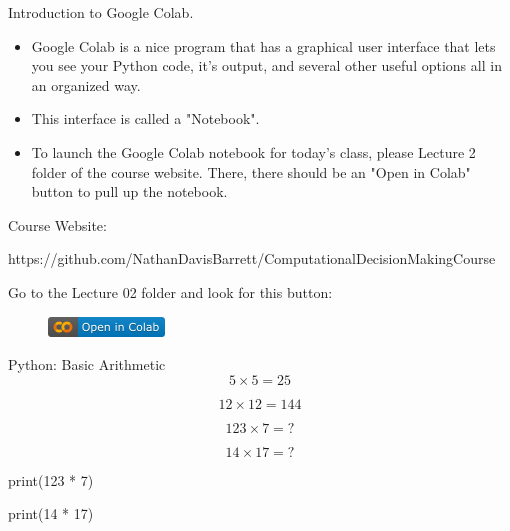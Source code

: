\documentclass[10pt, aspectratio=169]{beamer}
\begin{document}
\begin{frame}{Introduction to Google Colab.}
    \begin{itemize}
        \item Google Colab is a nice program that has a graphical user interface that lets you see your Python code, it's output, and several other useful options all in an organized way.
        \item This interface is called a "Notebook".
        \item To launch the Google Colab notebook for today's class, please Lecture 2 folder of the course website. There, there should be an "Open in Colab" button to pull up the notebook.
    \end{itemize}

    \begin{center}
        Course Website:

        https://github.com/NathanDavisBarrett/ComputationalDecisionMakingCourse

        \vspace{0.5cm}
        Go to the Lecture 02 folder and look for this button:
    \end{center}

    \begin{figure}
        \includegraphics[width=0.2\linewidth]{OpenInGoogleColab.png}
    \end{figure}
\end{frame}

\begin{frame}{Python: Basic Arithmetic}
    $$5 \times 5 = 25$$

    $$12 \times 12 = 144$$

    $$123 \times 7 = ?$$

    $$14 \times 17 = ?$$

    \vspace{1cm}
    \begin{center}
        print(123 * 7)

        print(14 * 17)   
    \end{center}
\end{frame}
\end{document}
